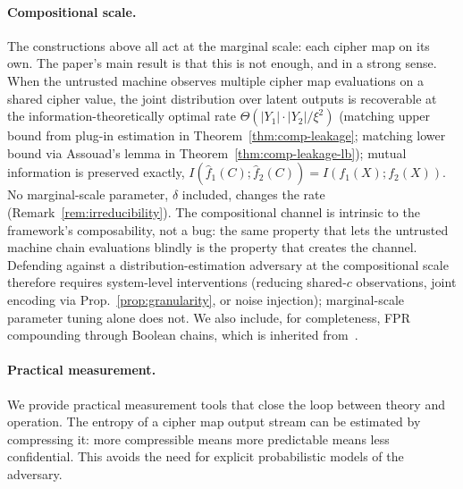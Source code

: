 \documentclass[conference]{IEEEtran}
\theoremstyle{definition}
\theoremstyle{plain}
\theoremstyle{remark}
\newcommand{\fhat}{\hat{f}}
\begin{document}
\paragraph{Compositional scale.}
The constructions above all act at the marginal scale: each cipher map
on its own.  The paper's main result is that this is not enough, and
in a strong sense.  When the untrusted machine observes multiple
cipher map evaluations on a shared cipher value, the joint
distribution over latent outputs is recoverable at the
information-theoretically optimal rate $\Theta(|Y_1|\cdot|Y_2|/\xi^2)$
(matching upper bound from plug-in estimation in
Theorem~\ref{thm:comp-leakage}; matching lower bound via Assouad's
lemma in Theorem~\ref{thm:comp-leakage-lb}); mutual
information is preserved exactly,
$I(\fhat_1(C); \fhat_2(C)) = I(f_1(X); f_2(X))$.  No marginal-scale
parameter, $\delta$ included, changes the rate (Remark~\ref{rem:irreducibility}).
The compositional channel is intrinsic to the framework's
composability, not a bug: the same property that lets the untrusted
machine chain evaluations blindly is the property that creates the
channel.  Defending against a distribution-estimation adversary at
the compositional scale therefore requires system-level interventions
(reducing shared-$c$ observations, joint encoding via
Prop.~\ref{prop:granularity}, or noise injection); marginal-scale
parameter tuning alone does not.  We also include, for completeness,
FPR compounding through Boolean chains, which is inherited
from~\cite[Sec.~7.4]{towell2026cipher}.

\paragraph{Practical measurement.}
We provide practical measurement tools that close the loop between
theory and operation.  The entropy of a cipher map output stream can
be estimated by compressing it: more compressible means more
predictable means less confidential.  This avoids the need for
explicit probabilistic models of the adversary.
\end{document}
